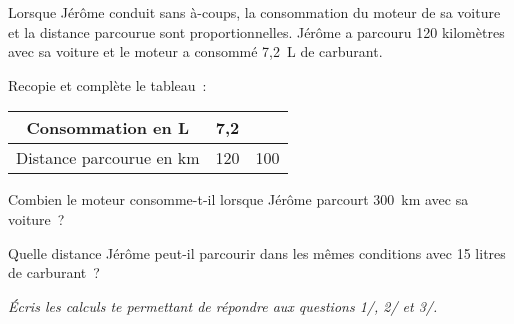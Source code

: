 Lorsque Jérôme conduit sans à-coups, la consommation du moteur de sa voiture et la distance parcourue sont proportionnelles. Jérôme a parcouru 120 kilomètres avec sa voiture et le moteur a consommé 7,2~L de carburant.
\begin{myenumerate}
  \item Recopie et complète le tableau :
    \begin{center}
      \begin{tabular}{|c|c|c|}
        \hline
        Consommation en L&7,2&\\
        \hline
        Distance parcourue en km&120&100\\
        \hline
      \end{tabular}
    \end{center}
  \item Combien le moteur consomme-t-il lorsque Jérôme parcourt 300~km avec sa voiture ?
  \item Quelle distance Jérôme peut-il parcourir dans les mêmes conditions avec 15 litres de carburant ?
\end{myenumerate}
{\em \'Ecris les calculs te permettant de répondre aux questions 1/, 2/ et 3/.}